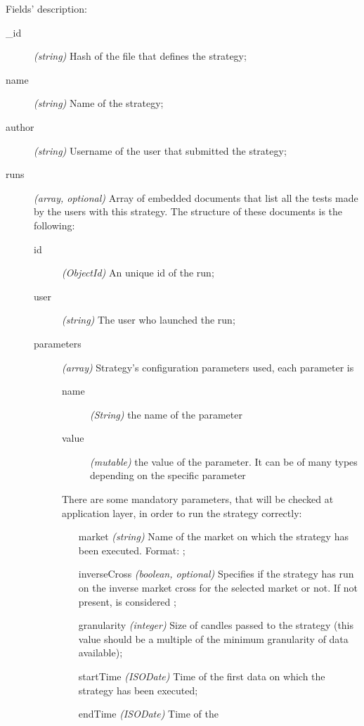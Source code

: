 Fields' description:
\begin{description}
	\item[\_id] \textit{(string)} Hash of the file that defines the
		strategy;
	\item[name] \textit{(string)} Name of the strategy;
	\item[author] \textit{(string)} Username of the user that submitted the
		strategy;
	\item[runs] \textit{(array, optional)} Array of embedded documents that
		list all the tests made by the users with this strategy. The
		structure of these documents is the following:
		\begin{description}
			\item[id] \textit{(ObjectId)} An unique id of the run;
			\item[user] \textit{(string)} The user who launched the
				run;
			\item[parameters] \textit{(array)} Strategy's
				configuration parameters used, each parameter is
				\begin{description}
					\item[name] \textit{(String)} the name
						of the parameter
					\item[value] \textit{(mutable)} the
						value of the parameter. It can
						be of many types depending on
						the specific parameter
				\end{description}
				There are some mandatory parameters, that will
				be checked at application layer, in order to run
				the strategy correctly:
				\begin{itemize}
					\item[market] \textit{(string)} Name of
						the market on which the strategy
						has been executed. Format:
						;
					\item[inverseCross] \textit{(boolean,
						optional)} Specifies if the
						strategy has run on the inverse
						market cross for the selected
						market or not. If not present,
						is considered ;
					\item[granularity] \textit{(integer)}
						Size of candles passed to the
						strategy (this value should be a
						multiple of the minimum
						granularity of data available);
					\item[startTime]
						\textit{(ISODate)} Time of the
						first data on which the strategy
						has been executed;
					\item[endTime]
						\textit{(ISODate)} Time of the

\end{itemize}
\end{description}
\end{description}
